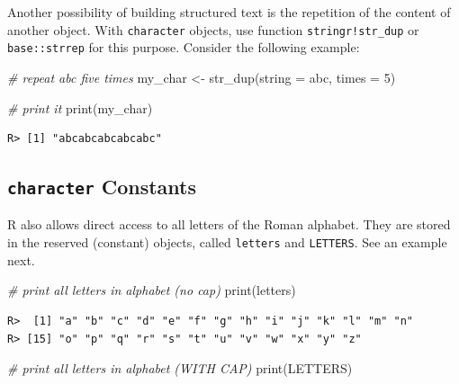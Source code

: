\documentclass[
  12pt,
]{book}
\newenvironment{Shaded}{\begin{snugshade}}{\end{snugshade}}
\newcommand{\AttributeTok}[1]{\textcolor[rgb]{0.61,0.61,0.61}{#1}}
\newcommand{\CommentTok}[1]{\textcolor[rgb]{0.37,0.37,0.37}{\textit{#1}}}
\newcommand{\DecValTok}[1]{\textcolor[rgb]{0.06,0.06,0.06}{#1}}
\newcommand{\FunctionTok}[1]{\textcolor[rgb]{0,0,0}{#1}}
\newcommand{\NormalTok}[1]{#1}
\newcommand{\OtherTok}[1]{\textcolor[rgb]{0.37,0.37,0.37}{#1}}
\newcommand{\StringTok}[1]{\textcolor[rgb]{0.5,0.5,0.5}{#1}}
\begin{document}
Another possibility of building structured text is the repetition of the content of another object. With \texttt{character} objects, use function \texttt{stringr!str\_dup} or \texttt{base::strrep} for this purpose. Consider the following example:  

\begin{Shaded}
\begin{Highlighting}[]
\CommentTok{\# repeat \textquotesingle{}abc\textquotesingle{} five times}
\NormalTok{my\_char }\OtherTok{\textless{}{-}} \FunctionTok{str\_dup}\NormalTok{(}\AttributeTok{string =} \StringTok{\textquotesingle{}abc\textquotesingle{}}\NormalTok{, }\AttributeTok{times =} \DecValTok{5}\NormalTok{)}

\CommentTok{\# print it}
\FunctionTok{print}\NormalTok{(my\_char)}
\end{Highlighting}
\end{Shaded}

\begin{verbatim}
R> [1] "abcabcabcabcabc"
\end{verbatim}

\hypertarget{character-constants}{%
\subsection{\texorpdfstring{\texttt{character} Constants}{character Constants}}\label{character-constants}}

R also allows direct access to all letters of the Roman alphabet. They are stored in the reserved (constant) objects, called \texttt{letters} and \texttt{LETTERS}. See an example next.  

\begin{Shaded}
\begin{Highlighting}[]
\CommentTok{\# print all letters in alphabet (no cap)}
\FunctionTok{print}\NormalTok{(letters)}
\end{Highlighting}
\end{Shaded}

\begin{verbatim}
R>  [1] "a" "b" "c" "d" "e" "f" "g" "h" "i" "j" "k" "l" "m" "n"
R> [15] "o" "p" "q" "r" "s" "t" "u" "v" "w" "x" "y" "z"
\end{verbatim}

\begin{Shaded}
\begin{Highlighting}[]
\CommentTok{\# print all letters in alphabet (WITH CAP)}
\FunctionTok{print}\NormalTok{(LETTERS)}
\end{Highlighting}
\end{Shaded}
\end{document}

